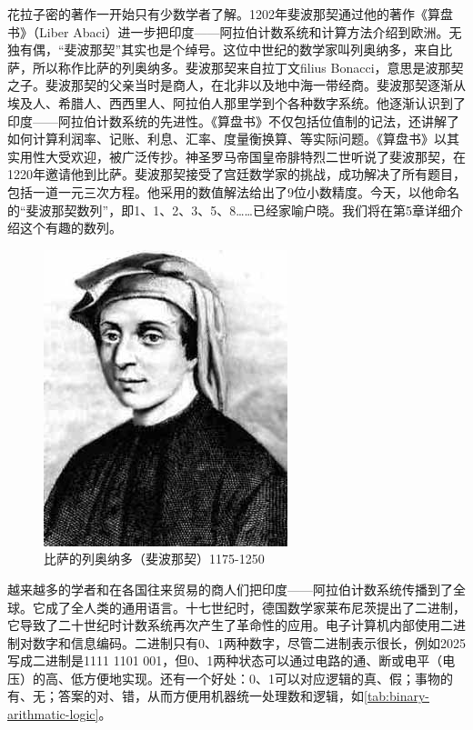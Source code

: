 \documentclass[b5paper]{ctexart}
\begin{document}
花拉子密的著作一开始只有少数学者了解。1202年斐波那契通过他的著作《算盘书》（Liber Abaci）进一步把印度——阿拉伯计数系统和计算方法介绍到欧洲。无独有偶，“斐波那契”其实也是个绰号。这位中世纪的数学家叫列奥纳多，来自比萨，所以称作比萨的列奥纳多。斐波那契来自拉丁文filius Bonacci，意思是波那契之子。斐波那契的父亲当时是商人，在北非以及地中海一带经商。斐波那契逐渐从埃及人、希腊人、西西里人、阿拉伯人那里学到个各种数字系统。他逐渐认识到了印度——阿拉伯计数系统的先进性。《算盘书》不仅包括位值制的记法，还讲解了如何计算利润率、记账、利息、汇率、度量衡换算、等实际问题。《算盘书》以其实用性大受欢迎，被广泛传抄。神圣罗马帝国皇帝腓特烈二世听说了斐波那契，在1220年邀请他到比萨。斐波那契接受了宫廷数学家的挑战，成功解决了所有题目，包括一道一元三次方程。他采用的数值解法给出了9位小数精度\cite{Gies-Carney-24}。今天，以他命名的“斐波那契数列”，即1、1、2、3、5、8……已经家喻户晓。我们将在第5章详细介绍这个有趣的数列。

\begin{figure}[htbp]
 \centering
 \includegraphics[scale=0.35]{img/Fibonacci}
 \caption{比萨的列奥纳多（斐波那契）1175-1250}
 \label{fig:Fibonacci}
\end{figure}

越来越多的学者和在各国往来贸易的商人们把印度——阿拉伯计数系统传播到了全球。它成了全人类的通用语言。十七世纪时，德国数学家莱布尼茨提出了二进制，它导致了二十世纪时计数系统再次产生了革命性的应用。电子计算机内部使用二进制对数字和信息编码。二进制只有0、1两种数字，尽管二进制表示很长，例如2025写成二进制是1111 1101 001，但0、1两种状态可以通过电路的通、断或电平（电压）的高、低方便地实现。还有一个好处：0、1可以对应逻辑的真、假；事物的有、无；答案的对、错，从而方便用机器统一处理数和逻辑，如\cref{tab:binary-arithmatic-logic}。
\end{document}
